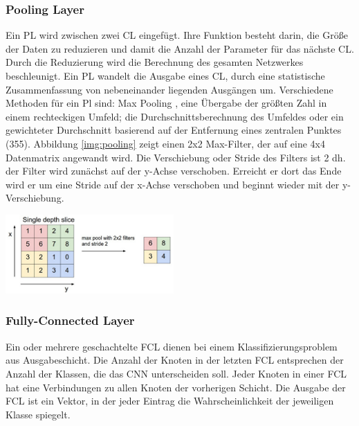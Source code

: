 \documentclass[twosided,a4,10pt]{article}
\begin{document}
\begin{multicols}{2}
		\subsubsection*{Pooling Layer}
		Ein PL wird zwischen zwei CL eingefügt. Ihre Funktion besteht darin, die Größe der Daten zu reduzieren und damit die Anzahl der Parameter für das nächste CL. Durch die Reduzierung wird die Berechnung des gesamten Netzwerkes beschleunigt. \cite{karpathy}\newline Ein PL wandelt die Ausgabe eines CL, durch eine statistische Zusammenfassung von nebeneinander liegenden Ausgängen um. Verschiedene Methoden für ein Pl sind: Max Pooling \cite{zhou}, eine Übergabe der größten Zahl in einem rechteckigen Umfeld; die Durchschnittsberechnung des Umfeldes oder ein gewichteter Durchschnitt basierend auf der Entfernung eines zentralen Punktes \cite{goodfellow}(355).\newline
		Abbildung \ref{img:pooling} zeigt einen 2x2 Max-Filter, der auf eine 4x4 Datenmatrix angewandt wird. Die Verschiebung oder Stride des Filters ist 2 dh. der Filter wird zunächst auf der y-Achse verschoben. Erreicht er dort das Ende wird er um eine Stride auf der x-Achse verschoben und beginnt wieder mit der y-Verschiebung.\newline\\
		\begin{minipage}{0.4\textwidth}
			\centering
			\includegraphics{img/pooling.png}
			\label{img:pooling}
		\end{minipage}\newline
		\subsubsection*{Fully-Connected Layer}
		Ein oder mehrere geschachtelte FCL dienen bei einem Klassifizierungsproblem aus Ausgabeschicht. Die Anzahl der Knoten in der letzten FCL entsprechen der Anzahl der Klassen, die das CNN unterscheiden soll.
		Jeder Knoten in einer FCL hat eine Verbindungen zu allen Knoten der vorherigen Schicht. Die Ausgabe der FCL ist ein Vektor, in der jeder Eintrag die Wahrscheinlichkeit der jeweiligen Klasse spiegelt. \cite{karpathy}

\end{multicols}
\end{document}

